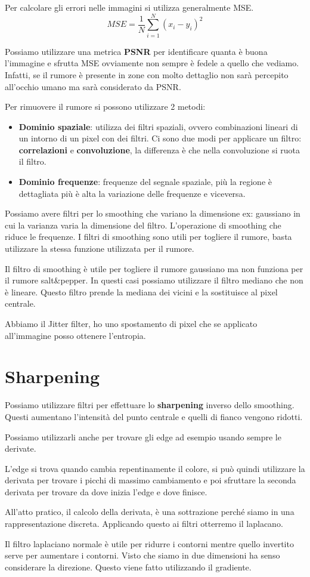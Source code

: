 Per calcolare gli errori nelle immagini si utilizza generalmente MSE.
\begin{equation*}
    MSE = \frac{1}{N}\sum_{i=1}^{N}(x_i-y_i)^2
\end{equation*}

Possiamo utilizzare una metrica \textbf{PSNR} per identificare quanta è buona
l'immagine e sfrutta MSE ovviamente non sempre è fedele a quello che vediamo.
Infatti, se il rumore è presente in zone con molto dettaglio non sarà percepito
all'occhio umano ma sarà considerato da PSNR.

Per rimuovere il rumore si possono utilizzare 2 metodi:
\begin{itemize}
    \item \textbf{Dominio spaziale}: utilizza dei filtri spaziali, ovvero
          combinazioni lineari di un intorno di un pixel con dei filtri.
          Ci sono due modi per applicare un filtro: \textbf{correlazioni} e
          \textbf{convoluzione}, la differenza è che nella convoluzione si ruota
          il filtro.
    \item \textbf{Dominio frequenze}: frequenze del segnale spaziale, più la
          regione è dettagliata più è alta la variazione delle frequenze e viceversa.
\end{itemize}

Possiamo avere filtri per lo smoothing che variano la dimensione ex: gaussiano 
in cui la varianza varia la dimensione del filtro. L'operazione di smoothing che 
riduce le frequenze. I filtri di smoothing sono utili per togliere il rumore, 
basta utilizzare la stessa funzione utilizzata per il rumore.

Il filtro di smoothing è utile per togliere il rumore gaussiano ma non funziona 
per il rumore salt\&pepper. In questi casi possiamo utilizzare il filtro mediano 
che non è lineare. Questo filtro prende la mediana dei vicini e la sostituisce
al pixel centrale. 

Abbiamo il Jitter filter, ho uno spostamento di pixel che se applicato all'immagine 
posso ottenere l'entropia.
\section{Sharpening}
Possiamo utilizzare filtri per effettuare lo \textbf{sharpening} inverso dello 
smoothing. Questi aumentano l'intensità del punto centrale e quelli di fianco 
vengono ridotti.

Possiamo utilizzarli anche per trovare gli edge ad esempio usando sempre le derivate.

L'edge si trova quando cambia repentinamente il colore, si può quindi utilizzare
la derivata per trovare i picchi di massimo cambiamento e poi sfruttare la seconda
derivata per trovare da dove inizia l'edge e dove finisce. 

All'atto pratico, il calcolo della derivata, è una sottrazione perché siamo in 
una rappresentazione discreta. Applicando questo ai filtri otterremo il laplacano. 

Il filtro laplaciano normale è utile per ridurre i contorni mentre quello 
invertito serve per aumentare i contorni. Visto che siamo in due dimensioni ha 
senso considerare la direzione. Questo viene fatto utilizzando il gradiente.

